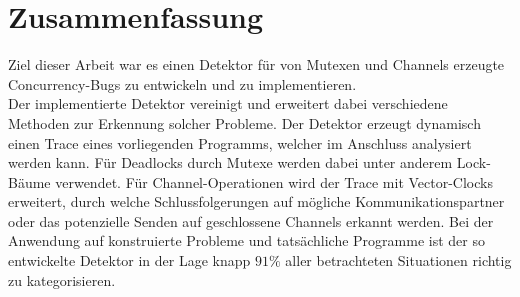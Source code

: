 \chapter{Zusammenfassung}\label{chap:conclusion}
Ziel dieser Arbeit war es einen Detektor für von Mutexen 
und Channels erzeugte Concurrency-Bugs zu entwickeln und zu implementieren.\\
Der implementierte Detektor vereinigt und erweitert dabei verschiedene Methoden 
zur Erkennung solcher Probleme. Der Detektor erzeugt dynamisch einen Trace 
eines vorliegenden Programms, welcher im Anschluss analysiert werden kann.
Für Deadlocks durch Mutexe werden dabei unter anderem Lock-Bäume verwendet. 
Für Channel-Operationen wird der Trace mit Vector-Clocks erweitert, 
durch welche Schlussfolgerungen auf mögliche Kommunikationspartner oder 
das potenzielle Senden auf geschlossene Channels erkannt werden. 
Bei der Anwendung auf konstruierte Probleme und tatsächliche Programme 
ist der so entwickelte Detektor in der Lage knapp $91\%$ aller betrachteten 
Situationen richtig zu kategorisieren. 
